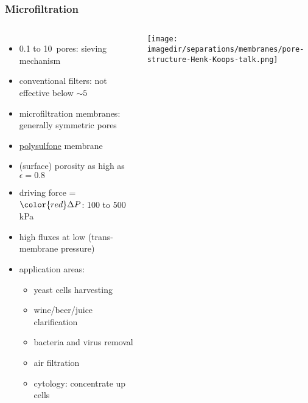 \begin{frame}\frametitle{Microfiltration}
	\begin{columns}[t]
			\vspace{-20pt}
			\begin{itemize}
				\item	0.1\micron \,\,to 10\micron\, pores: sieving mechanism %
				\item	conventional filters: not effective below $\sim 5$~\micron
				\item	microfiltration membranes: generally symmetric pores
				\item	\href{http://en.wikipedia.org/wiki/Polysulfone}{polysulfone} membrane
				\item	(surface) porosity as high as $\epsilon = 0.8$
				\item	driving force = ${\color{red}\Delta P}$: 100 to 500 kPa %
				\item	high fluxes at low {\color{purple}{TMP}} (trans-membrane pressure)
				\item	application areas:
					\begin{itemize}
						\item	yeast cells harvesting
						\item	wine/beer/juice clarification
						\item	bacteria and virus removal
						\item	air filtration
						\item	cytology: concentrate up cells
					\end{itemize}
			\end{itemize}
			
			\vspace{-45pt}
			\begin{center}
				\texttt{[image: \\imagedir/separations/membranes/pore-structure-Henk-Koops-talk.png]}
			\end{center}
	\end{columns}
\end{frame}

